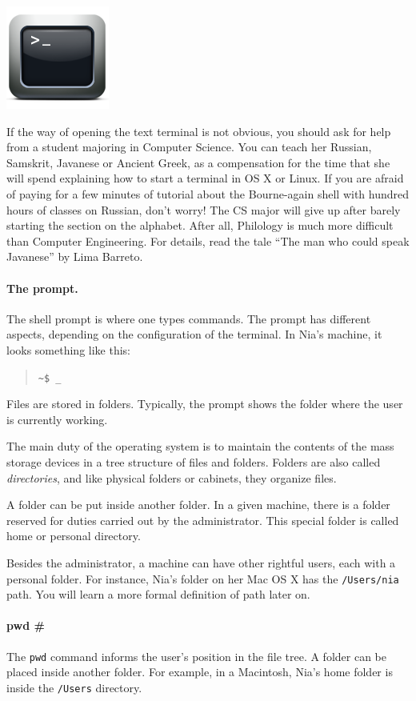 \documentclass[a4paper,12pt]{book}
\begin{document}
\includegraphics[scale=0.8]{figs/terminal.png}

If the way of opening the text terminal
is not obvious, you should ask for help
from a student majoring in Computer Science.
You can teach her Russian, Samskrit, Javanese
or Ancient Greek, as a compensation
for the time that she will spend explaining
how to start a terminal in 
OS X or Linux. If you are afraid
of paying for a few minutes of tutorial
about the Bourne-again shell
with hundred hours of classes on
Russian, don't worry! The CS
major will give up after barely
starting the section on the alphabet. After all,
Philology is much more difficult
than Computer Engineering.
For details, read the tale ``The man who could speak
Javanese'' by Lima Barreto.

\paragraph{The prompt.} 
The shell prompt
is where one types commands. The prompt
has different aspects, depending on the
configuration of the terminal.
In Nia's machine, it looks something like this:
\begin{quote}
\verb|~$ _|
\end{quote}
Files are stored in folders. Typically, the
prompt shows the folder where the user is
currently working.

The main duty of the
operating system is to maintain the contents of
the mass storage devices in a tree structure
of files and folders.
Folders are also called {\em directories},
and like physical folders or cabinets,
they organize files.

A folder can be put inside another folder.
In a given machine, there is a folder 
reserved for duties carried out by the
administrator.
This special folder is called home
or personal directory.

Besides the administrator, a machine can
have other rightful users, each with
a personal folder. For instance, Nia's folder
on her Mac OS X has the \verb|/Users/nia|
path. You will learn a more formal
definition of path later on.


\paragraph{pwd \#} 
The \verb|pwd| command informs
the user's position in the file tree.
A folder can be placed
inside another folder.
For example, in a Macintosh, Nia's home
folder is inside the \verb|/Users| directory.
\end{document}
